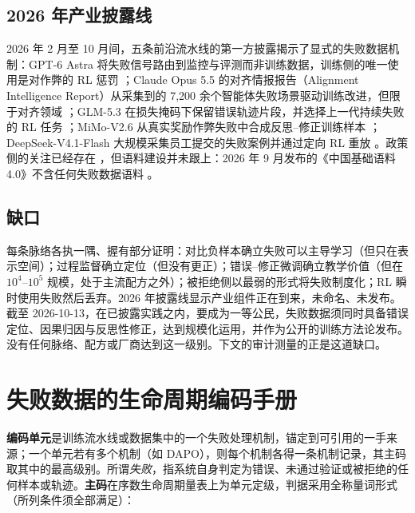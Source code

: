\documentclass[10pt,fontset=fandol]{ctexart}
\begin{document}
\subsection{2026 年产业披露线}

2026 年 2 月至 10 月间，五条前沿流水线的第一方披露揭示了显式的失败数据机制：GPT-6 Astra 将失败信号路由到监控与评测而非训练数据，训练侧的唯一使用是对作弊的 RL 惩罚 \cite{openai2026gpt6}；Claude Opus 5.5 的对齐情报报告（Alignment Intelligence Report）从采集到的 7,200 余个智能体失败场景驱动训练改进，但限于对齐领域 \cite{anthropic2026claude}；GLM-5.3 在损失掩码下保留错误轨迹片段，并选择上一代持续失败的 RL 任务 \cite{zai2026glm5}；MiMo-V2.6 从真实奖励作弊失败中合成反思--修正训练样本 \cite{xiaomi2026mimo}；DeepSeek-V4.1-Flash 大规模采集员工提交的失败案例并通过定向 RL 重放 \cite{deepseek2026v41}。政策侧的关注已经存在 \cite{waic2026}，但语料建设并未跟上：2026 年 9 月发布的《中国基础语料 4.0》不含任何失败数据语料 \cite{cac2026corpus}。

\subsection{缺口}

每条脉络各执一隅、握有部分证明：对比负样本确立失败可以主导学习（但只在表示空间）；过程监督确立定位（但没有更正）；错误--修正微调确立教学价值（但在 $10^4$--$10^5$ 规模，处于主流配方之外）；被拒绝侧以最弱的形式将失败制度化；RL 瞬时使用失败然后丢弃。2026 年披露线显示产业组件正在到来，未命名、未发布。截至 2026-10-13，在已披露实践之内，要成为一等公民，失败数据须同时具备错误定位、因果归因与反思性修正，达到规模化运用，并作为公开的训练方法论发布。没有任何脉络、配方或厂商达到这一级别。下文的审计测量的正是这道缺口。

\section{失败数据的生命周期编码手册}\label{sec:codebook}

\textbf{编码单元}是训练流水线或数据集中的一个失败处理机制，锚定到可引用的一手来源；一个单元若有多个机制（如 DAPO），则每个机制各得一条机制记录，其主码取其中的最高级别。所谓\emph{失败}，指系统自身判定为错误、未通过验证或被拒绝的任何样本或轨迹。\textbf{主码}在序数生命周期量表上为单元定级，判据采用全称量词形式（所列条件须全部满足）：
\end{document}
